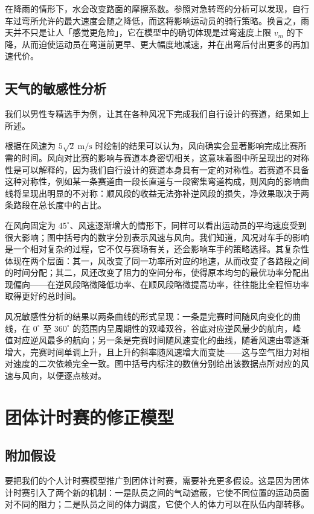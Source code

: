 \documentclass[11pt,a4paper]{ctexart}
\begin{document}
在降雨的情形下，水会改变路面的摩擦系数。参照对急转弯的分析可以发现，自行车过弯所允许的最大速度会随之降低，而这将影响运动员的骑行策略。换言之，雨天并不只是让人「感觉更危险」，它在模型中的确切体现是过弯速度上限 $v_m$ 的下降，从而迫使运动员在弯道前更早、更大幅度地减速，并在出弯后付出更多的再加速代价。

\subsection{天气的敏感性分析}

我们以男性专精选手为例，让其在各种风况下完成我们自行设计的赛道，结果如上所述。

根据在风速为 $5\sqrt{2}\ \mathrm{m/s}$ 时绘制的结果可以认为，风向确实会显著影响完成比赛所需的时间。风向对比赛的影响与赛道本身密切相关，这意味着图中所呈现出的对称性是可以解释的，因为我们自行设计的赛道本身具有一定的对称性。若赛道不具备这种对称性，例如某一条赛道由一段长直道与一段密集弯道构成，则风向的影响曲线将呈现出明显的不对称：顺风段的收益无法弥补逆风段的损失，净效果取决于两条路段在总长度中的占比。

在风向固定为 $45^\circ$、风速逐渐增大的情形下，同样可以看出运动员的平均速度受到很大影响；图中括号内的数字分别表示风速与风向。我们知道，风况对车手的影响是一个相对复杂的过程，它不仅与赛场有关，还会影响车手的策略选择。其复杂性体现在两个层面：其一，风改变了同一功率所对应的地速，从而改变了各路段之间的时间分配；其二，风还改变了阻力的空间分布，使得原本均匀的最优功率分配出现偏向——在逆风段略微降低功率、在顺风段略微提高功率，往往能比全程恒功率取得更好的总时间。

风况敏感性分析的结果以两条曲线的形式呈现：一条是完赛时间随风向变化的曲线，在 $0^\circ$ 至 $360^\circ$ 的范围内呈周期性的双峰双谷，谷底对应逆风最少的航向，峰值对应逆风最多的航向；另一条是完赛时间随风速变化的曲线，随着风速由零逐渐增大，完赛时间单调上升，且上升的斜率随风速增大而变陡——这与空气阻力对相对速度的二次依赖完全一致。图中括号内标注的数值分别给出该数据点所对应的风速与风向，以便逐点核对。
\section{团体计时赛的修正模型}

\subsection*{附加假设}

要把我们的个人计时赛模型推广到团体计时赛，需要补充更多假设。这是因为团体计时赛引入了两个新的机制：一是队员之间的气动遮蔽，它使不同位置的运动员面对不同的阻力；二是队员之间的体力调度，它使个人的体力可以在队伍内部转移。
\end{document}
